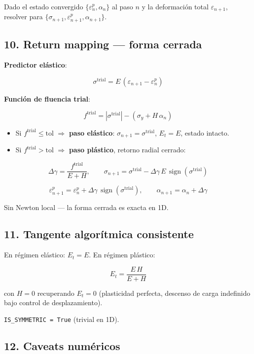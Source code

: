 \documentclass[11pt,letterpaper,oneside]{report}
\begin{document}
Dado el estado convergido $\{\varepsilon^p_n, \alpha_n\}$ al paso $n$ y la deformación total $\varepsilon_{n+1}$, resolver para $\{\sigma_{n+1}, \varepsilon^p_{n+1}, \alpha_{n+1}\}$.

\subsection{10. Return mapping --- forma cerrada}

\textbf{Predictor elástico}:

\[
\sigma^{\text{trial}} = E\,(\varepsilon_{n+1} - \varepsilon^p_n)
\]

\textbf{Función de fluencia trial}:

\[
f^{\text{trial}} = |\sigma^{\text{trial}}| - (\sigma_y + H\,\alpha_n)
\]

\begin{itemize}
  \item Si $f^{\text{trial}} \leq \text{tol}$ \ensuremath{\Rightarrow} \textbf{paso elástico}: $\sigma_{n+1} = \sigma^{\text{trial}}$, $E_t = E$, estado intacto.
  \item Si $f^{\text{trial}} > \text{tol}$ \ensuremath{\Rightarrow} \textbf{paso plástico}, retorno radial cerrado:
\end{itemize}

\[
\Delta\gamma = \frac{f^{\text{trial}}}{E + H}, \qquad \sigma_{n+1} = \sigma^{\text{trial}} - \Delta\gamma\,E\,\operatorname{sign}(\sigma^{\text{trial}})
\]

\[
\varepsilon^p_{n+1} = \varepsilon^p_n + \Delta\gamma\,\operatorname{sign}(\sigma^{\text{trial}}), \qquad \alpha_{n+1} = \alpha_n + \Delta\gamma
\]

Sin Newton local --- la forma cerrada es exacta en 1D.

\subsection{11. Tangente algorítmica consistente}

En régimen elástico: $E_t = E$. En régimen plástico:

\[
E_t = \frac{E\,H}{E + H}
\]

con $H = 0$ recuperando $E_t = 0$ (plasticidad perfecta, descenso de carga indefinido bajo control de desplazamiento).

\texttt{IS\_SYMMETRIC = True} (trivial en 1D).

\subsection{12. Caveats numéricos}
\end{document}
